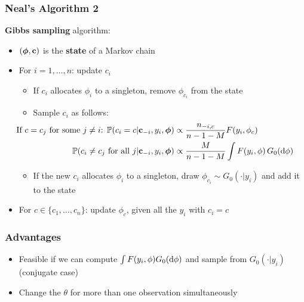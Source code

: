 \begin{frame} %
	\frametitle{Neal's Algorithm 2}
	\textbf{Gibbs sampling} algorithm:
	\begin{itemize}
		\item $(\boldsymbol\phi, \textbf c)$ is the \textbf{state} of a Markov chain
	    \item For $i= 1,\dots,n$: update $c_{i}$
	    \begin{itemize}
	        \item If $c_{i}$ allocates $\phi_i$ to a singleton, remove $\phi_{c_{i}}$ from the state
		    \item Sample $c_i$ as follows:
	        \begin{align*}
		        \hspace{-35pt}
                \text{If $c=c_j$ for some $j\neq i$: } \PP(c_{i}=c | \textbf c_{-i}, y_{i},\boldsymbol\phi) &\propto \frac{n_{-i,c}}{n-1-M} F(y_{i},\phi_{c}) \\
                \PP(c_{i}\neq c_{j} \text{ for all } j | \textbf c_{-i}, y_{i},\boldsymbol\phi) &\propto \frac{M }{n-1-M} \int F(y_{i},\phi) \, G_0(\de\phi)
            \end{align*}
            \item If the new $c_{i}$ allocates $\phi_i$ to a singleton, draw $\phi_{c_{i}} \sim G_0(\cdot|y_i)$ and add it to the state
        \end{itemize} 
        
       	\item For $c \in \{c_{1},\dots,c_{n}\}$: update $\phi_{c}$, given all the $y_{i}$ with $c_{i}=c$
	\end{itemize}
		
\end{frame}


\begin{frame}
	\frametitle{Advantages}
	\begin{itemize}
	    \item Feasible if we can compute $\int F(y_i,\phi) G_0(\mathrm d\phi)$ and sample from $G_0(\cdot|y_i)$ (conjugate case)
	    \item Change the $\theta$ for more than one observation simultaneously
	\end{itemize}
\end{frame}


